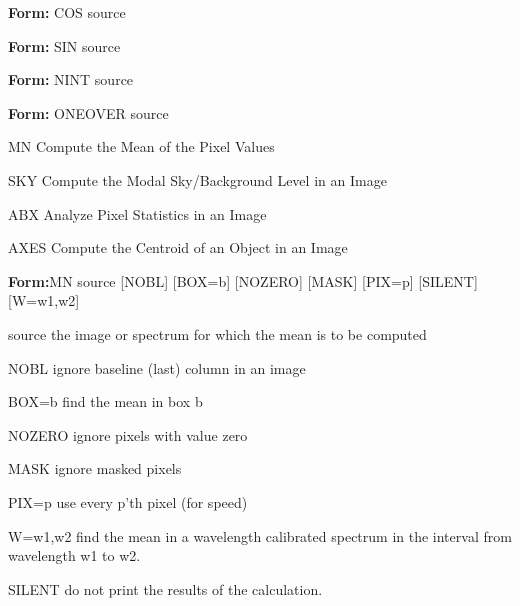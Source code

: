 {\newpage\clearpage
{}%
\begin{command}
  \item[\textbf{Form:} COS source\hfill]{}
\end{command}%
\lthtmlfigureZ
\lthtmlcheckvsize\clearpage}

{\newpage\clearpage
{}%
\begin{command}
  \item[\textbf{Form:} SIN source\hfill]{}
\end{command}%
\lthtmlfigureZ
\lthtmlcheckvsize\clearpage}

{\newpage\clearpage
{}%
\begin{command}
  \item[\textbf{Form:} NINT source\hfill]{}
\end{command}%
\lthtmlfigureZ
\lthtmlcheckvsize\clearpage}

{\newpage\clearpage
{}%
\begin{command}
  \item[\textbf{Form:} ONEOVER source\hfill]{}
\end{command}%
\lthtmlfigureZ
\lthtmlcheckvsize\clearpage}

{\newpage\clearpage
{}%
\begin{example}
  \item[MN\hfill]{Compute the Mean of the Pixel Values}
  \item[SKY\hfill]{Compute the Modal Sky/Background Level in an Image}
  \item[ABX\hfill]{Analyze Pixel Statistics in an Image}
  \item[AXES\hfill]{Compute the Centroid of an Object in an Image}
\end{example}%
\lthtmlfigureZ
\lthtmlcheckvsize\clearpage}

{\newpage\clearpage
{}%
\begin{command}
  \item[\textbf{Form:}MN source {[NOBL]} {[BOX=b]} {[NOZERO]} {[MASK]}
       {[PIX=p]} {[SILENT]} {[W=w1,w2]}\hfill]{}
  \item[source]{the image or spectrum for which the mean
       is to be computed}
  \item[NOBL]{ignore baseline (last) column in an image}
  \item[BOX=b]{find the mean in box b}
  \item[NOZERO]{ignore pixels with value zero}
  \item[MASK]{ignore masked pixels}
  \item[PIX=p]{use every p'th pixel (for speed)}
  \item[W=w1,w2]{find the mean in a wavelength calibrated
       spectrum in the interval from wavelength w1 to w2.}
  \item[SILENT]{do not print the results of the calculation.}
\end{command}%
\lthtmlfigureZ
\lthtmlcheckvsize\clearpage}


